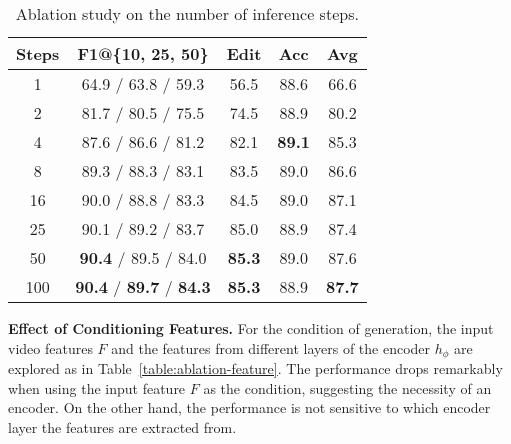 \documentclass[10pt,twocolumn,letterpaper]{article}
\begin{document}
\begin{table}[t]
\begin{center}
\footnotesize
\begin{tabular}{c | c c c c c c}
\hline
 Steps & \multicolumn{3}{c}{F1@\{10, 25, 50\}} & Edit & Acc & Avg\\
\hline
1 & \multicolumn{3}{c}{ 64.9 / 63.8 / 59.3 } & 56.5 & 88.6 & 66.6 \\
2 & \multicolumn{3}{c}{ 81.7 / 80.5 / 75.5 } & 74.5 & 88.9 & 80.2 \\
4 & \multicolumn{3}{c}{ 87.6 / 86.6 / 81.2 } & 82.1 & \textbf{89.1} & 85.3 \\
8 & \multicolumn{3}{c}{ 89.3 / 88.3 / 83.1 } & 83.5 & 89.0 & 86.6 \\
16 & \multicolumn{3}{c}{ 90.0 / 88.8 / 83.3 } & 84.5 & 89.0 & 87.1 \\
25 & \multicolumn{3}{c}{ 90.1 / 89.2 / 83.7 } & 85.0 & 88.9 & 87.4 \\
50 & \multicolumn{3}{c}{ \textbf{90.4} / 89.5 / 84.0 } & \textbf{85.3} & 89.0 & 87.6 \\
100 & \multicolumn{3}{c}{ \textbf{90.4} / \textbf{89.7} / \textbf{84.3} } & \textbf{85.3} & 88.9 & \textbf{87.7} \\
\hline
\end{tabular}
\end{center}
\caption{Ablation study on the number of inference steps.} 
\label{table:ablation-steps}
\end{table}

\textbf{Effect of Conditioning Features.}
For the condition of generation, the input video features $F$ and the features from different layers of the encoder $h_\phi$ are explored as in Table~\ref{table:ablation-feature}.
The performance drops remarkably when using the input feature $F$ as the condition, suggesting the necessity of an encoder.
On the other hand, the performance is not sensitive to which encoder layer the features are extracted from.
\end{document}
